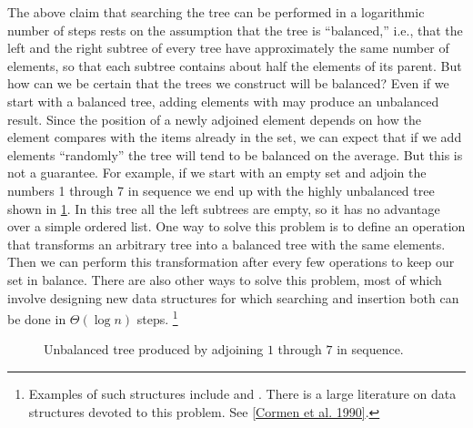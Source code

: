 The above claim that searching the tree can be performed in a logarithmic number of steps rests on the assumption that the tree is “balanced,” i.e., that the left and the right subtree of every tree have approximately the same number of elements, so that each subtree contains about half the elements of its parent.
But how can we be certain that the trees we construct will be balanced?
Even if we start with a balanced tree, adding elements with  may produce an unbalanced result.
Since the position of a newly adjoined element depends on how the element compares with the items already in the set, we can expect that if we add elements “randomly” the tree will tend to be balanced on the average.
But this is not a guarantee.
For example, if we start with an empty set and adjoin the numbers 1 through 7 in sequence we end up with the highly unbalanced tree shown in \cref{Figure 2.17}.
In this tree all the left subtrees are empty, so it has no advantage over a simple ordered list.
One way to solve this problem is to define an operation that transforms an arbitrary tree into a balanced tree with the same elements.
Then we can perform this transformation after every few  operations to keep our set in balance.
There are also other ways to solve this problem, most of which involve designing new data structures for which searching and insertion both can be done in \( Θ(\log n) \) steps.%
\footnote{
	Examples of such structures include  and .
	There is a large literature on data structures devoted to this problem.
	See \cref{Cormen et al. 1990}.
}

\begin{figure}[tb]
	\centering
	
	\caption{
		Unbalanced tree produced by adjoining \( 1 \) through \( 7 \) in sequence.
	}
	\label{Figure 2.17}
\end{figure}



